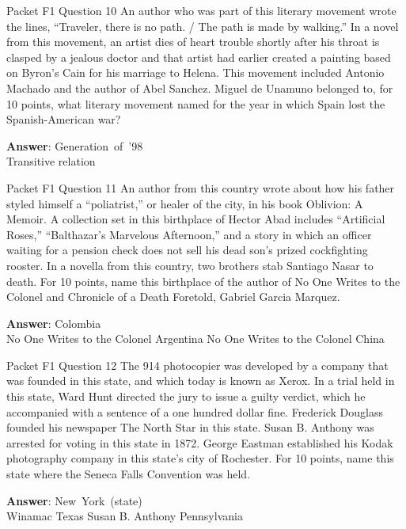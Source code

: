 \begin{frame}{Packet F1 Question 10}
An author who was part   of this literary movement wrote the lines, “Traveler, there is no path. / The path is made by walking.” In a novel from this movement, an artist dies of heart trouble shortly after his throat is clasped by a jealous doctor and that artist had earlier created a painting based on Byron’s Cain for his marriage to Helena. This movement included Antonio Machado and the author of Abel   Sanchez. Miguel de   Unamuno belonged to, for 10 points, what literary movement named for the year   in which Spain lost the Spanish-American war?  

\textbf{Answer}: Generation\ of\ '98\\
 Transitive relation
\end{frame}

\begin{frame}{Packet F1 Question 11}
An author from this country wrote about how his father styled himself a “poliatrist,” or healer of the city, in his book Oblivion: A Memoir. A collection set in this birthplace of Hector Abad includes “Artificial Roses,” “Balthazar’s Marvelous Afternoon,” and a story in which an officer waiting for a pension check does not sell his dead son’s prized cockfighting   rooster. In a novella from this country, two brothers stab   Santiago Nasar to death. For 10 points, name this birthplace of the author of No One Writes to the Colonel and Chronicle of a Death Foretold, Gabriel Garcia Marquez.      

\textbf{Answer}: Colombia\\
 No One Writes to the Colonel
 Argentina
 No One Writes to the Colonel
 China
\end{frame}

\begin{frame}{Packet F1 Question 12}
The 914 photocopier was developed by a company that was founded in this state, and which today is known as Xerox. In a trial held in this state, Ward Hunt directed the jury to issue a guilty verdict, which he accompanied with a sentence of a one hundred dollar fine. Frederick Douglass founded his newspaper The North Star in this state. Susan B. Anthony was arrested for voting in this state in 1872. George Eastman established his Kodak photography company in this state’s city of Rochester. For 10 points, name this state where the Seneca Falls Convention was held.        

\textbf{Answer}: New\ York\ (state)\\
 Winamac
 Texas
 Susan B. Anthony
 Pennsylvania
\end{frame}

